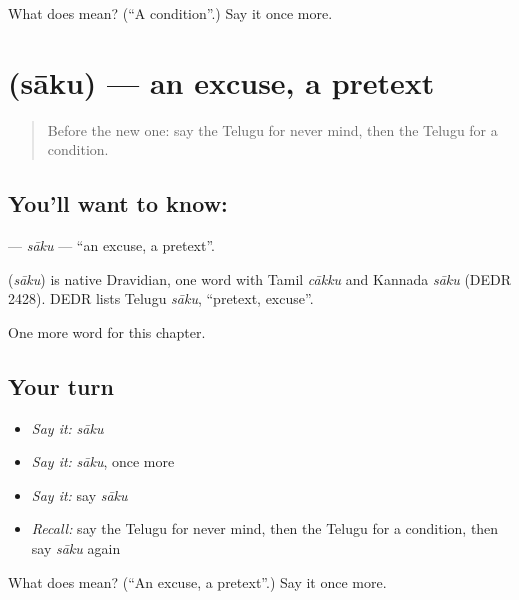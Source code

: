 \begin{tcolorbox}[breakable,colback=teal!4,colframe=teal!35!black,title={Before you move on}]
What does  mean? (\textquotedblleft{}A condition\textquotedblright{}.) Say it once more.
\end{tcolorbox}
\section[\texorpdfstring{\te{సాకు} (sāku)}{సాకు (sāku)}]{ (sāku) — an excuse, a pretext}

\label{lesson:TE-C178-saku}



\begin{quote}
Before the new one: say the Telugu for never mind, then the Telugu for a condition.
\end{quote}

\subsection*{You'll want to know: }
\textbf{} — \emph{sāku} — \textquotedblleft{}an excuse, a pretext\textquotedblright{}.

\begin{cousinweb}
\textbf{} (\emph{sāku}) is native Dravidian, one word with Tamil \emph{cākku} and Kannada \emph{sāku} (DEDR 2428). DEDR lists Telugu \emph{sāku}, \textquotedblleft{}pretext, excuse\textquotedblright{}.
\end{cousinweb}

\begin{grammarlens}[title={What you've built}]
One more word for this chapter.
\end{grammarlens}

\subsection*{Your turn}
\begin{itemize}
\raggedright
  \item \emph{Say it:} \emph{sāku}
  \item \emph{Say it:} \emph{sāku}, once more
  \item \emph{Say it:} say \emph{sāku}
  \item \emph{Recall:} say the Telugu for never mind, then the Telugu for a condition, then say \emph{sāku} again
\end{itemize}

\begin{tcolorbox}[breakable,colback=teal!4,colframe=teal!35!black,title={Before you move on}]
What does  mean? (\textquotedblleft{}An excuse, a pretext\textquotedblright{}.) Say it once more.
\end{tcolorbox}
